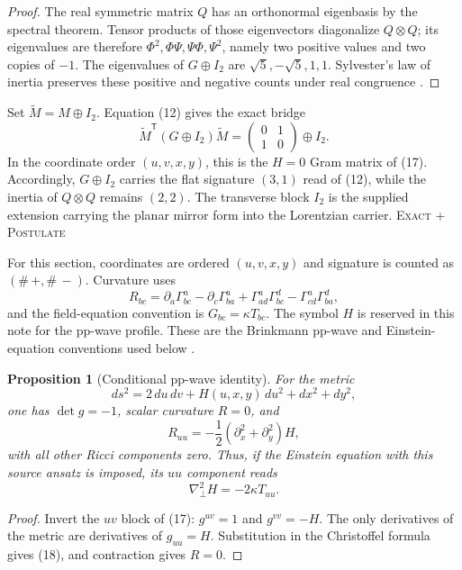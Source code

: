 \documentclass[10pt]{article}
\newtheorem{proposition}[definition]{Proposition}
\theoremstyle{remark}
\newcommand{\cstatus}[1]{\hfill\textsc{#1}}
\newcommand{\exact}{\textsc{Exact}}
\newcommand{\postulate}{\textsc{Postulate}}
\begin{document}
\begin{proof}
The real symmetric matrix $Q$ has an orthonormal eigenbasis by the spectral
theorem.  Tensor products of those eigenvectors diagonalize $Q\otimes Q$;
its eigenvalues are therefore $\Phi^2,\Phi\Psi,\Psi\Phi,\Psi^2$, namely two
positive values and two copies of $-1$.  The eigenvalues of $G\oplus I_2$
are $\sqrt5,-\sqrt5,1,1$.  Sylvester's law of inertia preserves these
positive and negative counts under real congruence
\cite{hornjohnson}.
\end{proof}

Set $\widetilde M=M\oplus I_2$.  Equation (12) gives the exact bridge
\[
 \widetilde M^{\mathsf T}(G\oplus I_2)\widetilde M
 =\begin{pmatrix}0&1\\1&0\end{pmatrix}\oplus I_2.
\]
In the coordinate order $(u,v,x,y)$, this is the $H=0$ Gram matrix of (17).
Accordingly, $G\oplus I_2$ carries the flat signature $(3,1)$ read of (12),
while the inertia of $Q\otimes Q$ remains $(2,2)$.  The transverse block
$I_2$ is the supplied extension carrying the planar mirror form into the
Lorentzian carrier. \cstatus{\exact\; + \postulate}

For this section, coordinates are ordered $(u,v,x,y)$ and signature is
counted as $(\#\,+,\#\,-)$.  Curvature uses
\[
 R_{bc}=\partial_a\Gamma^a_{bc}-\partial_c\Gamma^a_{ba}
 +\Gamma^a_{ad}\Gamma^d_{bc}-\Gamma^a_{cd}\Gamma^d_{ba},
\]
and the field-equation convention is $G_{bc}=\kappa T_{bc}$.  The symbol
$H$ is reserved in this note for the pp-wave profile.  These are the
Brinkmann pp-wave and Einstein-equation conventions used below
\cite{brinkmann1925,einstein1916}.

\begin{proposition}[Conditional pp-wave identity]\label{prop:pp}
For the metric
\[
 ds^2=2\,du\,dv+H(u,x,y)\,du^2+dx^2+dy^2,
\tag{17}
\]
one has $\det g=-1$, scalar curvature $R=0$, and
\[
 R_{uu}=-\frac12(\partial_x^2+\partial_y^2)H,
\tag{18}
\]
with all other Ricci components zero.  Thus, if the Einstein equation with
this source ansatz is imposed, its $uu$ component reads
\[
 \nabla_\perp^2H=-2\kappa T_{uu}.
\tag{19}
\]
\end{proposition}

\begin{proof}
Invert the $uv$ block of (17): $g^{uv}=1$ and $g^{vv}=-H$.  The only
derivatives of the metric are derivatives of $g_{uu}=H$.  Substitution in the
Christoffel formula gives (18), and contraction gives $R=0$.
\end{proof}
\end{document}
